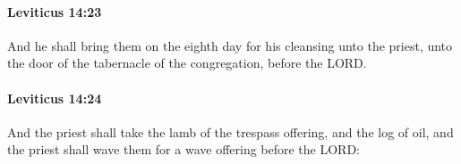		\paragraph{Leviticus 14:23} %
			\label{LEVITICUS-14-23}

			And he shall bring them on the eighth day for his cleansing unto the priest, unto the door of the tabernacle of the congregation, before the LORD.


		\paragraph{Leviticus 14:24} %
			\label{LEVITICUS-14-24}

			And the priest shall take the lamb of the trespass offering, and the log of oil, and the priest shall wave them for a wave offering before the LORD:


